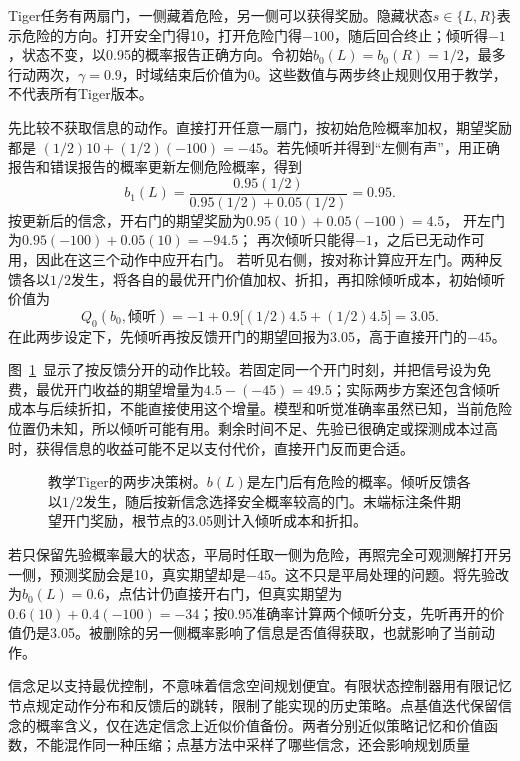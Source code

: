\begin{example}
  \label{ex:rl-information-tiger}
  Tiger任务有两扇门，一侧藏着危险，另一侧可以获得奖励。隐藏状态$s\in\{L,R\}$表示危险的方向。打开安全门得10，打开危险门得$-100$，随后回合终止；倾听得$-1$，状态不变，以0.95的概率报告正确方向。令初始$b_0(L)=b_0(R)=1/2$，最多行动两次，$\gamma=0.9$，时域结束后价值为0。这些数值与两步终止规则仅用于教学，不代表所有Tiger版本。

  先比较不获取信息的动作。直接打开任意一扇门，按初始危险概率加权，期望奖励都是
  $(1/2)10+(1/2)(-100)=-45$。若先倾听并得到“左侧有声”，用正确报告和错误报告的概率更新左侧危险概率，得到
  \[
    b_1(L)=\frac{0.95(1/2)}
                        {0.95(1/2)+0.05(1/2)}=0.95.
  \]
  按更新后的信念，开右门的期望奖励为$0.95(10)+0.05(-100)=4.5$，
  开左门为$0.95(-100)+0.05(10)=-94.5$；
  再次倾听只能得$-1$，之后已无动作可用，因此在这三个动作中应开右门。
  若听见右侧，按对称计算应开左门。两种反馈各以$1/2$发生，将各自的最优开门价值加权、折扣，再扣除倾听成本，初始倾听价值为
  \[
    Q_0(b_0,\text{倾听})
       =-1+0.9\bigl[(1/2)4.5+(1/2)4.5\bigr]=3.05.
  \]
  在此两步设定下，先倾听再按反馈开门的期望回报为3.05，高于直接开门的$-45$。
\end{example}

图~\ref{fig:rl-information-tiger}~显示了按反馈分开的动作比较。若固定同一个开门时刻，并把信号设为免费，最优开门收益的期望增量为$4.5-(-45)=49.5$；实际两步方案还包含倾听成本与后续折扣，不能直接使用这个增量。模型和听觉准确率虽然已知，当前危险位置仍未知，所以倾听可能有用。剩余时间不足、先验已很确定或探测成本过高时，获得信息的收益可能不足以支付代价，直接开门反而更合适。

\begin{figure}[htbp]
  \centering
  
  \caption{教学Tiger的两步决策树。$b(L)$是左门后有危险的概率。倾听反馈各以$1/2$发生，随后按新信念选择安全概率较高的门。末端标注条件期望开门奖励，根节点的3.05则计入倾听成本和折扣。}
  \label{fig:rl-information-tiger}
\end{figure}

若只保留先验概率最大的状态，平局时任取一侧为危险，再照完全可观测解打开另一侧，预测奖励会是10，真实期望却是$-45$。这不只是平局处理的问题。将先验改为$b_0(L)=0.6$，点估计仍直接开右门，但真实期望为$0.6(10)+0.4(-100)=-34$；按0.95准确率计算两个倾听分支，先听再开的价值仍是3.05。被删除的另一侧概率影响了信息是否值得获取，也就影响了当前动作。

信念足以支持最优控制，不意味着信念空间规划便宜。有限状态控制器用有限记忆节点规定动作分布和反馈后的跳转，限制了能实现的历史策略。点基值迭代保留信念的概率含义，仅在选定信念上近似价值备份。两者分别近似策略记忆和价值函数，不能混作同一种压缩；点基方法中采样了哪些信念，还会影响规划质量

